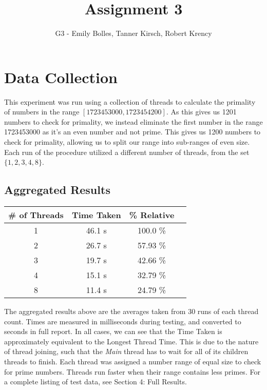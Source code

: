 \documentclass[12pt]{article}
\title{Assignment 3}
\author{G3 - Emily Bolles, Tanner Kirsch, Robert Krency}
\date{}
\begin{document}
\maketitle

\section{Data Collection}

This experiment was run using a collection of threads to calculate the primality of numbers in the range \([1723453000,1723454200]\).
As this gives us 1201 numbers to check for primality, we instead eliminate the first number in the range 1723453000 as it's an even number and not prime.
This gives us 1200 numbers to check for primality, allowing us to split our range into sub-ranges of even size.
Each run of the procedure utilized a different number of threads, from the set \(\{1,2,3,4,8\}\).

\subsection{Aggregated Results}

\begin{center}
    \begin{tabular}{| c | c | c | c |}
        \hline
        \textbf{\# of Threads} & \textbf{Time Taken} & \textbf{\% Relative} \\ \hline
        1 & 46.1 s & 100.0 \% \\ \hline
        2 & 26.7 s & 57.93 \% \\ \hline
        3 & 19.7 s & 42.66 \% \\ \hline
        4 & 15.1 s & 32.79 \% \\ \hline
        8 & 11.4 s & 24.79 \% \\ \hline
    \end{tabular}
\end{center}

The aggregated results above are the averages taken from 30 runs of each thread count. 
Times are measured in milliseconds during testing, and converted to seconds in full report.
In all cases, we can see that the Time Taken is approximately equivalent to the Longest Thread Time.
This is due to the nature of thread joining, such that the \textit{Main} thread has to wait for all of its children threads to finish.
Each thread was assigned a number range of equal size to check for prime numbers.
Threads run faster when their range contains less primes. 
For a complete listing of test data, see Section 4: Full Results.
\end{document}
